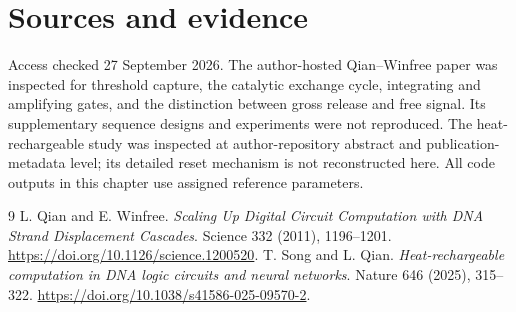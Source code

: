 \clearpage
\section*{Sources and evidence}
Access checked 27 September 2026. The author-hosted Qian--Winfree paper was
inspected for threshold capture, the catalytic exchange cycle, integrating and
amplifying gates, and the distinction between gross release and free signal.
Its supplementary sequence designs and experiments were not reproduced.
The heat-rechargeable study was inspected at author-repository abstract and
publication-metadata level; its detailed reset mechanism is not reconstructed
here. All code outputs in this chapter use assigned reference parameters.
\begingroup\let\chapter\section
\begin{thebibliography}{9}
 L. Qian and E. Winfree.
\emph{Scaling Up Digital Circuit Computation with DNA Strand Displacement Cascades}.
Science 332 (2011), 1196--1201.
\url{https://doi.org/10.1126/science.1200520}.
 T. Song and L. Qian.
\emph{Heat-rechargeable computation in DNA logic circuits and neural networks}.
Nature 646 (2025), 315--322.
\url{https://doi.org/10.1038/s41586-025-09570-2}.
\end{thebibliography}\endgroup
